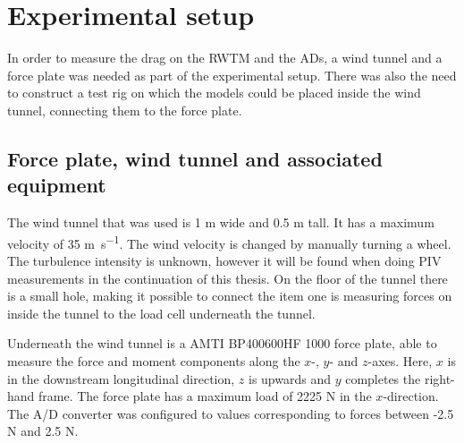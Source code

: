 \section{Experimental setup}

In order to measure the drag on the \gls{RWTM} and the \gls{AD}s, a wind tunnel and a force plate was needed as part of the experimental setup. There was also the need to construct a test rig on which the models could be placed inside the wind tunnel, connecting them to the force plate. 

\subsection{Force plate, wind tunnel and associated equipment}
The wind tunnel that was used is 1 \si{\metre} wide and 0.5 \si{\m} tall. It has a maximum velocity of 35 \si{\m\per\s}. The wind velocity is changed by manually turning a wheel. The turbulence intensity is unknown, however it will be found when doing \gls{PIV} measurements in the continuation of this thesis. On the floor of the tunnel there is a small hole, making it possible to connect the item one is measuring forces on inside the tunnel to the load cell underneath the tunnel.  


Underneath the wind tunnel is a AMTI BP400600HF 1000 force plate, able to measure the force and moment components along the $x$-, $y$- and $z$-axes. Here, $x$ is in the downstream longitudinal direction, $z$ is upwards and $y$ completes the right-hand frame. The force plate has a maximum load of 2225 \si{\N} in the $x$-direction. The A/D converter was configured to values corresponding to forces between -2.5 \si
{\N} and 2.5 \si{\N}. %





